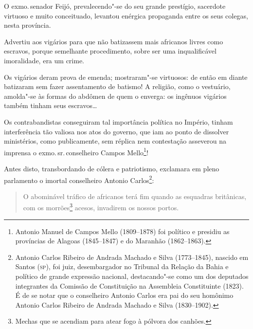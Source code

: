 O exmo.\,senador Feijó, prevalecendo"-se do seu grande prestígio,
sacerdote virtuoso e muito conceituado, levantou enérgica propaganda
entre os seus colegas, nesta província.

Advertiu aos vigários para que não batizassem mais africanos livres como
escravos, porque semelhante procedimento, sobre ser uma inqualificável
imoralidade, era um crime.

Os vigários deram prova de emenda; mostraram"-se virtuosos: de então em
diante batizaram sem fazer assentamento de batismo! A religião, como o
vestuário, amolda"-se às formas do abdômen de quem o enverga: os ingênuos
vigários também tinham seus escravos\ldots{}

Os contrabandistas conseguiram tal importância política no Império,
tinham interferência tão valiosa nos atos do governo, que iam ao ponto
de dissolver ministérios, como publicamente, sem réplica nem contestação
asseverou na imprensa o exmo.\,sr.\,conselheiro Campos Mello\footnote{
  Antonio Manuel de Campos Mello (1809--1878) foi político e presidiu as
  províncias de Alagoas (1845--1847) e do Maranhão (1862--1863).}!

Antes disto, transbordando de cólera e patriotismo, exclamara em pleno
parlamento o imortal conselheiro Antonio Carlos\footnote{Antonio
  Carlos Ribeiro de Andrada Machado e Silva (1773--1845), nascido em
  Santos (\textsc{sp}), foi juiz, desembargador no Tribunal da Relação da Bahia e
  político de grande expressão nacional, destacando"-se como um dos
  deputados integrantes da Comissão de Constituição na Assembleia
  Constituinte (1823). É de se notar que o conselheiro Antonio Carlos
  era pai do seu homônimo Antonio Carlos Ribeiro de Andrada Machado e
  Silva (1830--1902).}:


\begin{quote}
O abominável tráfico de africanos terá fim quando as esquadras
britânicas, com os morrões\footnote{Mechas que se acendiam para atear
  fogo à pólvora dos canhões.} acesos, invadirem os nossos portos.
\end{quote}

